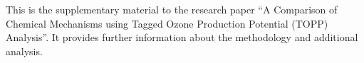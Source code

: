 This is the supplementary material to the research paper ``A Comparison of Chemical Mechanisms using Tagged Ozone Production Potential (TOPP) Analysis''. 
It provides further information about the methodology and additional analysis.  
